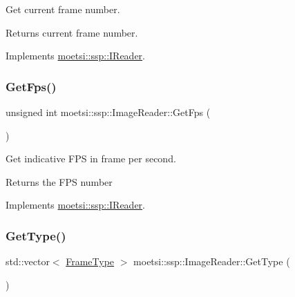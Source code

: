 Get current frame number. 

\begin{DoxyReturn}{Returns}
current frame number. 
\end{DoxyReturn}


Implements \hyperlink{classmoetsi_1_1ssp_1_1IReader_ac292d83eb06dee277baaa06e281a562d}{moetsi\+::ssp\+::\+I\+Reader}.

\mbox{\label{classmoetsi_1_1ssp_1_1ImageReader_a86adfec8106c366aaf1ec63e2a7da156}} 
\subsubsection{\texorpdfstring{Get\+Fps()}{GetFps()}}
{\footnotesize\ttfamily unsigned int moetsi\+::ssp\+::\+Image\+Reader\+::\+Get\+Fps (\begin{DoxyParamCaption}{ }\end{DoxyParamCaption})\hspace{0.3cm}{\ttfamily [virtual]}}



Get indicative F\+PS in frame per second. 

\begin{DoxyReturn}{Returns}
the F\+PS number 
\end{DoxyReturn}


Implements \hyperlink{classmoetsi_1_1ssp_1_1IReader_a9f6a8650ca290b011b8e5451eeae9f32}{moetsi\+::ssp\+::\+I\+Reader}.

\mbox{\label{classmoetsi_1_1ssp_1_1ImageReader_af6f66957b6e3268c5336f4176c77fc73}} 
\subsubsection{\texorpdfstring{Get\+Type()}{GetType()}}
{\footnotesize\ttfamily std\+::vector$<$ \hyperlink{namespacemoetsi_1_1ssp_a46efdfa2cd5a28ead465dcc8006b5a87}{Frame\+Type} $>$ moetsi\+::ssp\+::\+Image\+Reader\+::\+Get\+Type (\begin{DoxyParamCaption}{ }\end{DoxyParamCaption})\hspace{0.3cm}{\ttfamily [virtual]}}



